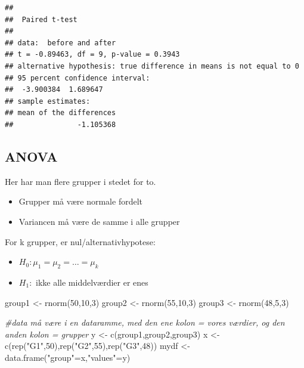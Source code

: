 \documentclass[
]{book}
\newenvironment{Shaded}{\begin{snugshade}}{\end{snugshade}}
\newcommand{\CommentTok}[1]{\textcolor[rgb]{0.56,0.35,0.01}{\textit{#1}}}
\newcommand{\DecValTok}[1]{\textcolor[rgb]{0.00,0.00,0.81}{#1}}
\newcommand{\FunctionTok}[1]{\textcolor[rgb]{0.00,0.00,0.00}{#1}}
\newcommand{\NormalTok}[1]{#1}
\newcommand{\OtherTok}[1]{\textcolor[rgb]{0.56,0.35,0.01}{#1}}
\newcommand{\StringTok}[1]{\textcolor[rgb]{0.31,0.60,0.02}{#1}}
\providecommand{\tightlist}{%
  \setlength{\itemsep}{0pt}\setlength{\parskip}{0pt}}
\begin{document}
\begin{verbatim}
## 
##  Paired t-test
## 
## data:  before and after
## t = -0.89463, df = 9, p-value = 0.3943
## alternative hypothesis: true difference in means is not equal to 0
## 95 percent confidence interval:
##  -3.900384  1.689647
## sample estimates:
## mean of the differences 
##               -1.105368
\end{verbatim}

\hypertarget{anova}{%
\subsection{ANOVA}\label{anova}}

Her har man flere grupper i stedet for to.

\begin{itemize}
\tightlist
\item
  Grupper må være normale fordelt
\item
  Variancen må være de samme i alle grupper
\end{itemize}

For k grupper, er nul/alternativhypotese:

\begin{itemize}
\tightlist
\item
  \(H_{0}: \mu_{1} = \mu_{2} = \ldots = \mu_{k}\)
\item
  \(H_{1}:\) ikke alle middelværdier er enes
\end{itemize}

\begin{Shaded}
\begin{Highlighting}[]
\NormalTok{group1 }\OtherTok{\textless{}{-}} \FunctionTok{rnorm}\NormalTok{(}\DecValTok{50}\NormalTok{,}\DecValTok{10}\NormalTok{,}\DecValTok{3}\NormalTok{)}
\NormalTok{group2 }\OtherTok{\textless{}{-}} \FunctionTok{rnorm}\NormalTok{(}\DecValTok{55}\NormalTok{,}\DecValTok{10}\NormalTok{,}\DecValTok{3}\NormalTok{)}
\NormalTok{group3 }\OtherTok{\textless{}{-}} \FunctionTok{rnorm}\NormalTok{(}\DecValTok{48}\NormalTok{,}\DecValTok{5}\NormalTok{,}\DecValTok{3}\NormalTok{)}

\CommentTok{\#data må være i en dataramme, med den ene kolon = vores værdier, og den anden kolon = grupper}
\NormalTok{y }\OtherTok{\textless{}{-}} \FunctionTok{c}\NormalTok{(group1,group2,group3)}
\NormalTok{x }\OtherTok{\textless{}{-}} \FunctionTok{c}\NormalTok{(}\FunctionTok{rep}\NormalTok{(}\StringTok{"G1"}\NormalTok{,}\DecValTok{50}\NormalTok{),}\FunctionTok{rep}\NormalTok{(}\StringTok{"G2"}\NormalTok{,}\DecValTok{55}\NormalTok{),}\FunctionTok{rep}\NormalTok{(}\StringTok{"G3"}\NormalTok{,}\DecValTok{48}\NormalTok{))}
\NormalTok{mydf }\OtherTok{\textless{}{-}} \FunctionTok{data.frame}\NormalTok{(}\StringTok{"group"}\OtherTok{=}\NormalTok{x,}\StringTok{"values"}\OtherTok{=}\NormalTok{y)}
\end{Highlighting}
\end{Shaded}
\end{document}
